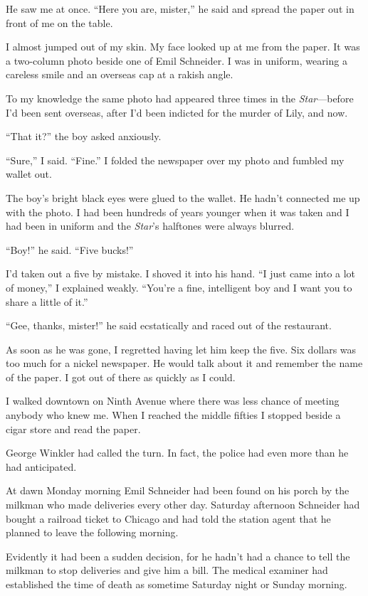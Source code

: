 \documentclass{novel}
\begin{document}
He saw me at once. “Here you are, mister,” he said and spread the paper out in front of me on the table.

I almost jumped out of my skin. My face looked up at me from the paper. It was a two-column photo beside one of Emil Schneider. I was in uniform, wearing a careless smile and an overseas cap at a rakish angle.

To my knowledge the same photo had appeared three times in the \textit{Star}—before I’d been sent overseas, after I’d been indicted for the murder of Lily, and now.

“That it?” the boy asked anxiously.

“Sure,” I said. “Fine.” I folded the newspaper over my photo and fumbled my wallet out.

The boy’s bright black eyes were glued to the wallet. He hadn’t connected me up with the photo. I had been hundreds of years younger when it was taken and I had been in uniform and the \textit{Star}’s halftones were always blurred.

“Boy!” he said. “Five bucks!”

I’d taken out a five by mistake. I shoved it into his hand. “I just came into a lot of money,” I explained weakly. “You’re a fine, intelligent boy and I want you to share a little of it.”

“Gee, thanks, mister!” he said ecstatically and raced out of the restaurant.

As soon as he was gone, I regretted having let him keep the five. Six dollars was too much for a nickel newspaper. He would talk about it and remember the name of the paper. I got out of there as quickly as I could.

\scenestars

I walked downtown on Ninth Avenue where there was less chance of meeting anybody who knew me. When I reached the middle fifties I stopped beside a cigar store and read the paper.

George Winkler had called the turn. In fact, the police had even more than he had anticipated.

At dawn Monday morning Emil Schneider had been found on his porch by the milkman who made deliveries every other day. Saturday afternoon Schneider had bought a railroad ticket to Chicago and had told the station agent that he planned to leave the following morning. 

Evidently it had been a sudden decision, for he hadn’t had a chance to tell the milkman to stop deliveries and give him a bill. The medical examiner had established the time of death as sometime Saturday night or Sunday morning.
\end{document}
